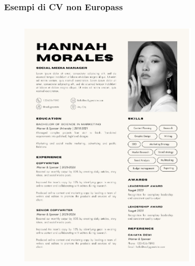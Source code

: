 \documentclass[handout]{beamer}
\begin{document}
\begin{frame}
\frametitle{Esempi di CV non Europass}
\begin{columns}
  \begin{column}{.45\textwidth}
    \begin{figure}
      \includegraphics[width=\columnwidth]{img/cv3.png}
    \end{figure} 
  \end{column}
  \begin{column}{.45\textwidth}
    \begin{figure}

\end{figure}
\end{column}
\end{columns}
\end{frame}
\end{document}
